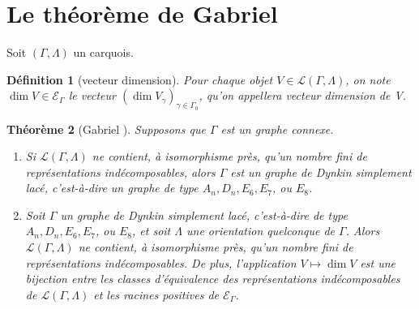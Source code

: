 \documentclass[a4paper,11pt]{article}
\newtheorem{thm}{Théorème}[section]
\newtheorem{defi}[thm]{Définition}%
\newcommand{\EG}{\mathscr{E}_\Gamma}
\begin{document}
\section{Le théorème de Gabriel}
Soit $(\Gamma,\Lambda)$ un carquois.
\begin{defi}[vecteur dimension]
	Pour chaque objet $V\in\mathscr L(\Gamma,\Lambda)$, on note $\dim V\in\EG$ le vecteur $(\dim V_\gamma)_{\gamma\in\Gamma_0}$, qu'on appellera \emph{vecteur dimension} de V.
\end{defi}
\begin{thm}[Gabriel \cite{G72}] Supposons que $\Gamma$ est un graphe connexe.
	\begin{enumerate}
		\item Si $\mathscr L(\Gamma,\Lambda)$ ne contient, à isomorphisme près, qu'un nombre fini de représentations indécomposables, alors $\Gamma$ est un graphe de Dynkin simplement lacé, c'est-à-dire un graphe de type $A_n,D_n,E_6,E_7$, ou $E_8$.
		\item Soit $\Gamma$ un graphe de Dynkin simplement lacé, c'est-à-dire de type $A_n,D_n,E_6,E_7$, ou $E_8$, et soit $\Lambda$ une orientation quelconque de $\Gamma$. Alors $\mathscr L(\Gamma,\Lambda)$ ne contient, à isomorphisme près, qu'un nombre fini de représentations indécomposables. De plus, l'application $V\mapsto\dim V$ est une bijection entre les classes d'équivalence des représentations indécomposables de $\mathscr L(\Gamma,\Lambda)$ et les racines positives de $\EG$.
	\end{enumerate}
\end{thm}
\end{document}
